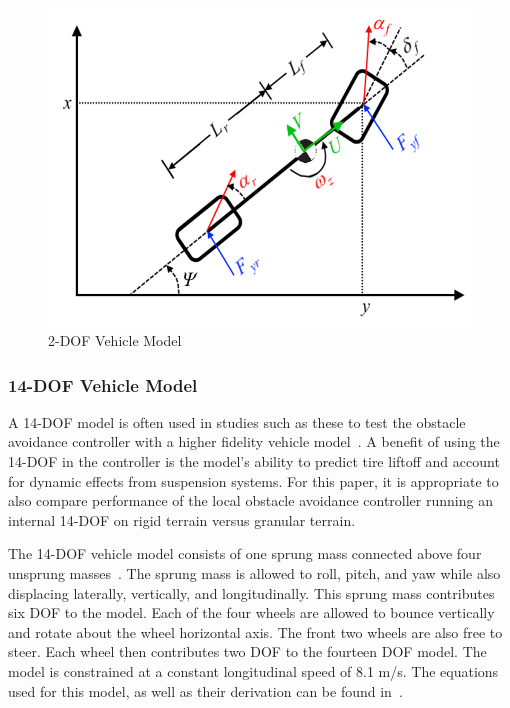 \documentclass[12pt,onecolumn]{article}
\begin{document}
\begin{figure}
	\centering
	\includegraphics[width=1.0\columnwidth]{Figs/2DOF_haraus.png}
	\caption{\small 2-DOF Vehicle Model}  
	\label{fig:2DOF}
\end{figure}


\subsubsection{14-DOF Vehicle Model}\label{sss:14DOFModel}
A 14-DOF model is often used in studies such as these to test the obstacle avoidance controller with a higher fidelity vehicle model~\cite{ModelFidelity2016, ModelFidelity2013}. A benefit of using the 14-DOF in the controller is the model's ability to predict tire liftoff and account for dynamic effects from suspension systems. For this paper, it is appropriate to also compare performance of the local obstacle avoidance controller running an internal 14-DOF on rigid terrain versus granular terrain.  

The 14-DOF vehicle model consists of one sprung mass connected above four unsprung masses~\cite{RollStudies2007}. The sprung mass is allowed to roll, pitch, and yaw while also displacing laterally, vertically, and longitudinally. This sprung mass contributes six DOF to the model. Each of the four wheels are allowed to bounce vertically and rotate about the wheel horizontal axis. The front two wheels are also free to steer. Each wheel then contributes two DOF to the fourteen DOF model. The model is constrained at a constant longitudinal speed of 8.1 m/s. The equations used for this model, as well as their derivation can be found in~\cite{RollStudies2007}.
\end{document}
